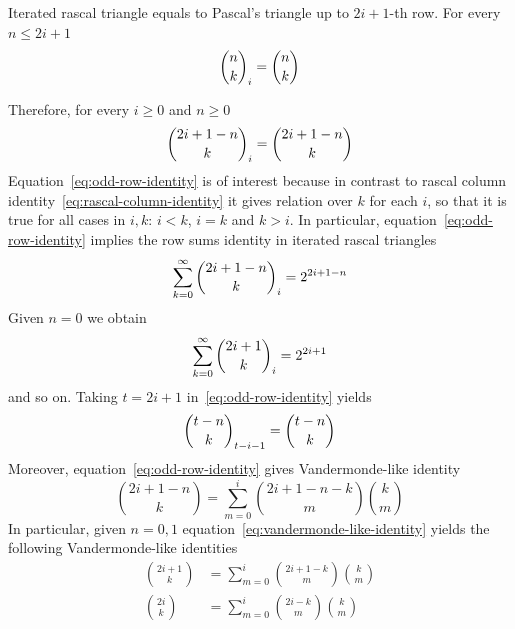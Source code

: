 \begin{proposition}
    \label{prop:odd-row-proposition}
    Iterated rascal triangle equals to Pascal's triangle up to $2i+1$-th row.
    For every $n \leq 2i+1$
    \begin{align*}
        \binom{n}{k}_{i} = \binom{n}{k}
    \end{align*}
\end{proposition}
Therefore, for every $i \geq 0$ and $n \geq 0$
\begin{equation}
    \binom{2i+1-n}{k}_{i} = \binom{2i+1-n}{k}
    \label{eq:odd-row-identity}
\end{equation}
Equation~\eqref{eq:odd-row-identity} is of interest because in contrast to rascal
column identity~\eqref{eq:rascal-column-identity} it gives relation over $k$ for each $i$,
so that it is true for all cases in $i,k$: $i < k$, $i=k$ and $k >i$.
In particular, equation~\eqref{eq:odd-row-identity} implies the row sums identity in iterated rascal triangles
\begin{align*}
    \sum_{k=0}^{\infty} \binom{2i+1-n}{k}_{i} = 2^{2i+1-n}
\end{align*}
Given $n=0$ we obtain
\begin{align*}
    \sum_{k=0}^{\infty} \binom{2i+1}{k}_{i} = 2^{2i+1}
\end{align*}
and so on.
Taking $t=2i+1$ in~\eqref{eq:odd-row-identity} yields
\begin{align*}
    \binom{t-n}{k}_{t-i-1}= \binom{t-n}{k}
\end{align*}
Moreover, equation~\eqref{eq:odd-row-identity} gives Vandermonde-like identity
\begin{equation}
    \binom{2i+1-n}{k} = \sum_{m=0}^{i} \binom{2i+1-n-k}{m} \binom{k}{m}
    \label{eq:vandermonde-like-identity}
\end{equation}
In particular, given $n=0,1$ equation~\eqref{eq:vandermonde-like-identity}
yields the following Vandermonde-like identities
\begin{align*}
    \binom{2i+1}{k} &= \sum_{m=0}^{i} \binom{2i+1-k}{m} \binom{k}{m} \\
    \binom{2i}{k}   &= \sum_{m=0}^{i} \binom{2i-k}{m} \binom{k}{m}
\end{align*}
